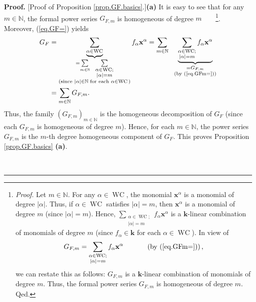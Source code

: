 \documentclass[numbers=enddot,12pt,final,onecolumn,notitlepage]{scrartcl}%
\theoremstyle{definition}
\newenvironment{proof}[1][Proof]{\noindent\textbf{#1.} }{\ \rule{0.5em}{0.5em}}
\let\sumnonlimits\sum
\renewcommand{\sum}{\sumnonlimits\limits}
\newenvironment{verlong}{}{}
\begin{document}
\begin{verlong}
\begin{proof}
[Proof of Proposition \ref{prop.GF.basics}.]\textbf{(a)} It is easy to see
that for any $m\in\mathbb{N}$, the formal power series $G_{F,m}$ is
homogeneous of degree $m$\ \ \ \ \footnote{\textit{Proof.} Let $m\in
\mathbb{N}$. For any $\alpha\in\operatorname*{WC}$, the monomial
$\mathbf{x}^{\alpha}$ is a monomial of degree $\left\vert \alpha\right\vert $.
Thus, if $\alpha\in\operatorname*{WC}$ satisfies $\left\vert \alpha\right\vert
=m$, then $\mathbf{x}^{\alpha}$ is a monomial of degree $m$ (since $\left\vert
\alpha\right\vert =m$). Hence, $\sum_{\substack{\alpha\in\operatorname*{WC}%
;\\\left\vert \alpha\right\vert =m}}f_{\alpha}\mathbf{x}^{\alpha}$ is a
$\mathbf{k}$-linear combination of monomials of degree $m$ (since $f_{\alpha
}\in\mathbf{k}$ for each $\alpha\in\operatorname*{WC}$). In view of
\[
G_{F,m}=\sum_{\substack{\alpha\in\operatorname*{WC};\\\left\vert
\alpha\right\vert =m}}f_{\alpha}\mathbf{x}^{\alpha}\ \ \ \ \ \ \ \ \ \ \left(
\text{by (\ref{eq.GFm=})}\right)  ,
\]
we can restate this as follows: $G_{F,m}$ is a $\mathbf{k}$-linear combination
of monomials of degree $m$. Thus, the formal power series $G_{F,m}$ is
homogeneous of degree $m$. Qed.}. Moreover, (\ref{eq.GF=}) yields%
\begin{align}
G_{F}  &  =\underbrace{\sum_{\alpha\in\operatorname*{WC}}}_{\substack{=\sum
_{m\in\mathbb{N}}\ \ \sum_{\substack{\alpha\in\operatorname*{WC};\\\left\vert
\alpha\right\vert =m}}\\\text{(since }\left\vert \alpha\right\vert
\in\mathbb{N}\text{ for each }\alpha\in\operatorname*{WC}\text{)}}}f_{\alpha
}\mathbf{x}^{\alpha}=\sum_{m\in\mathbb{N}}\ \ \underbrace{\sum
_{\substack{\alpha\in\operatorname*{WC};\\\left\vert \alpha\right\vert
=m}}f_{\alpha}\mathbf{x}^{\alpha}}_{\substack{=G_{F,m}\\\text{(by
(\ref{eq.GFm=}))}}}\nonumber\\
&  =\sum_{m\in\mathbb{N}}G_{F,m}. \label{pf.prop.GF.basics.a.GF=sum}%
\end{align}
Thus, the family $\left(  G_{F,m}\right)  _{m\in\mathbb{N}}$ is the
homogeneous decomposition of $G_{F}$ (since each $G_{F,m}$ is homogeneous of
degree $m$). Hence, for each $m\in\mathbb{N}$, the power series $G_{F,m}$ is
the $m$-th degree homogeneous component of $G_{F}$. This proves Proposition
\ref{prop.GF.basics} \textbf{(a)}.


\end{proof}
\end{verlong}
\end{document}

